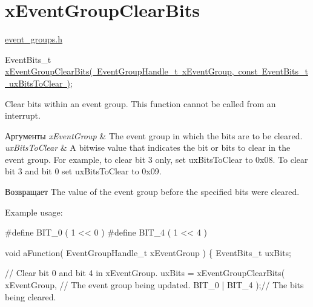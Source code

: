 \hypertarget{group__x_event_group_clear_bits}{}\section{x\+Event\+Group\+Clear\+Bits}
\label{group__x_event_group_clear_bits}
\mbox{\hyperlink{event__groups_8h}{event\+\_\+groups.\+h}} 
\begin{DoxyPre}
   EventBits\_t \mbox{\hyperlink{event__groups_8h_a0fb72cfdd4f0d5f86d955fc3af448f2a}{xEventGroupClearBits( EventGroupHandle\_t xEventGroup, const EventBits\_t uxBitsToClear )}};
\end{DoxyPre}


Clear bits within an event group. This function cannot be called from an interrupt.


\begin{DoxyParams}{Аргументы}
{\em x\+Event\+Group} & The event group in which the bits are to be cleared.\\
\hline
{\em ux\+Bits\+To\+Clear} & A bitwise value that indicates the bit or bits to clear in the event group. For example, to clear bit 3 only, set ux\+Bits\+To\+Clear to 0x08. To clear bit 3 and bit 0 set ux\+Bits\+To\+Clear to 0x09.\\
\hline
\end{DoxyParams}
\begin{DoxyReturn}{Возвращает}
The value of the event group before the specified bits were cleared.
\end{DoxyReturn}
Example usage\+: 
\begin{DoxyPre}
  \#define BIT\_0 ( 1 << 0 )
  \#define BIT\_4 ( 1 << 4 )\end{DoxyPre}



\begin{DoxyPre}  void aFunction( EventGroupHandle\_t xEventGroup )
  \{
  EventBits\_t uxBits;\end{DoxyPre}



\begin{DoxyPre}    // Clear bit 0 and bit 4 in xEventGroup.
    uxBits = xEventGroupClearBits(
                            xEventGroup,    // The event group being updated.
                            BIT\_0 | BIT\_4 );// The bits being cleared.\end{DoxyPre}



